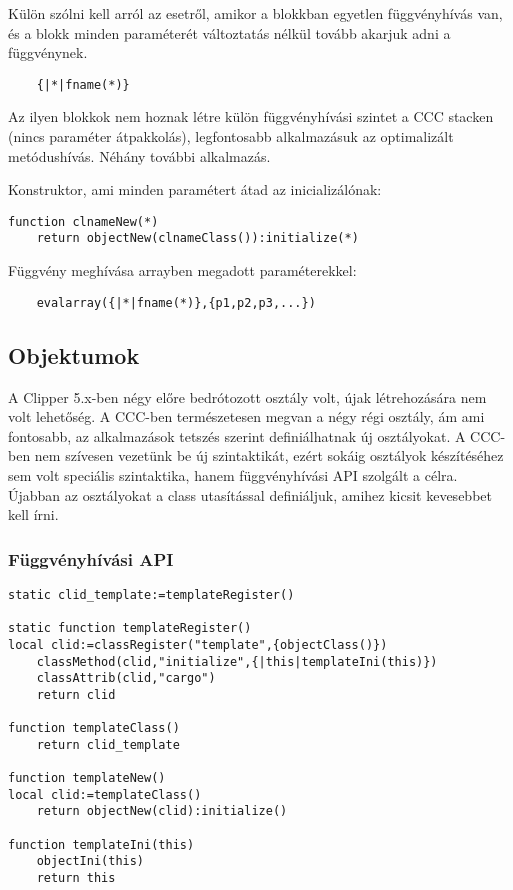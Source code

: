 Külön szólni kell arról az esetről,
amikor a blokkban egyetlen függvényhívás van, és a blokk
minden paraméterét változtatás nélkül tovább akarjuk adni a függvénynek.
\begin{verbatim}
    {|*|fname(*)}
\end{verbatim}
Az ilyen blokkok nem hoznak létre külön függvényhívási szintet a CCC stacken
(nincs paraméter átpakkolás), legfontosabb alkalmazásuk az optimalizált 
metódushívás. Néhány további alkalmazás.

Konstruktor, ami minden paramétert átad az inicializálónak:
\begin{verbatim}
function clnameNew(*)
    return objectNew(clnameClass()):initialize(*)
\end{verbatim}

Függvény meghívása arrayben megadott paraméterekkel:
\begin{verbatim}
    evalarray({|*|fname(*)},{p1,p2,p3,...})
\end{verbatim}


\subsection{Objektumok}

A Clipper 5.x-ben négy előre bedrótozott osztály volt, 
újak létrehozására nem volt lehetőség. A CCC-ben természetesen 
megvan a négy régi osztály, ám ami fontosabb, az alkalmazások 
tetszés szerint definiálhatnak új osztályokat. 
A CCC-ben nem szívesen vezetünk be új szintaktikát, 
ezért sokáig osztályok készítéséhez sem volt speciális szintaktika, 
hanem  függvényhívási API szolgált a célra. 
Újabban az osztályokat a class utasítással definiáljuk, 
amihez kicsit kevesebbet kell írni. 

\subsubsection{Függvényhívási API}

\begin{verbatim}
static clid_template:=templateRegister()

static function templateRegister()
local clid:=classRegister("template",{objectClass()})
    classMethod(clid,"initialize",{|this|templateIni(this)})
    classAttrib(clid,"cargo")
    return clid

function templateClass()
    return clid_template

function templateNew()
local clid:=templateClass()
    return objectNew(clid):initialize()

function templateIni(this)
    objectIni(this)
    return this
\end{verbatim}


